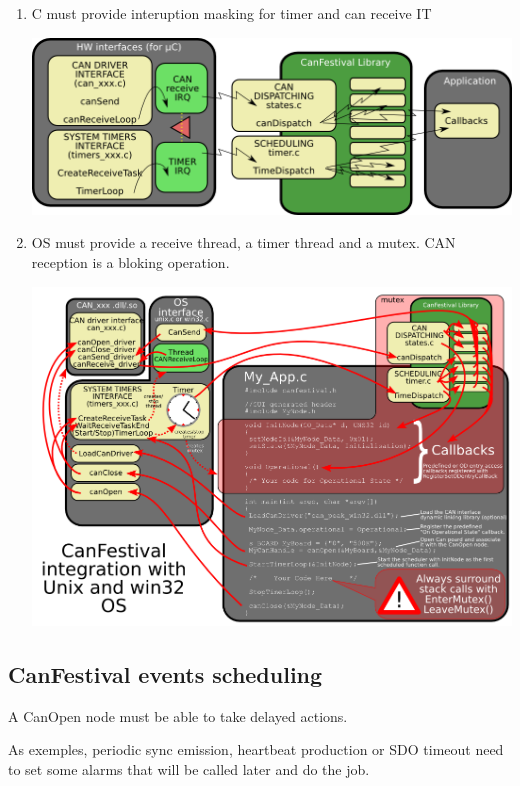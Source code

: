 \documentclass[12pt,twoside]{article}
\newcommand\liststyleLvi{%
\renewcommand\labelitemi{{--}}
\renewcommand\labelitemii{{--}}
\renewcommand\labelitemiii{{--}}
\renewcommand\labelitemiv{{--}}
}
\begin{document}
\liststyleLvi
\begin{enumerate}
\item {\textmu}C must provide interuption masking for timer and can
receive IT\newline
 \begin{center}
   \includegraphics[width=20cm]{Pictures/10000201000003CA0000016604E6A5EF.png}
\end{center}
\item OS must provide a receive thread, a timer thread and a mutex. CAN
reception is a bloking operation.\newline
\begin{center}
   \includegraphics[width=20cm]{Pictures/10000201000003F9000002CF8B0CDAEA.png}
\end{center}
\end{enumerate}
\subsection{CanFestival events scheduling}
A CanOpen node must be able to take delayed actions.

As exemples, periodic sync emission, heartbeat production or SDO timeout
need to set some alarms that will be called later and do the job.
\end{document}

